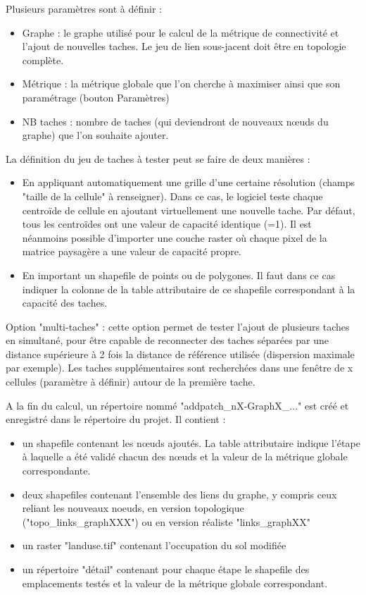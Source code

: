 \documentclass{article}
\begin{document}
Plusieurs paramètres sont à définir :
\begin{itemize}
	\item Graphe : le graphe utilisé pour le calcul de la métrique de connectivité et l’ajout de nouvelles taches. Le jeu de lien sous-jacent doit être en topologie complète.
	\item Métrique : la métrique globale que l’on cherche à maximiser ainsi que son paramétrage (bouton Paramètres)
	\item NB taches : nombre de taches (qui deviendront de nouveaux nœuds du graphe) que l’on souhaite ajouter.
\end{itemize}

La définition du jeu de taches à tester peut se faire de deux manières : 
\begin{itemize}
	\item En appliquant automatiquement une grille d’une certaine résolution (champs "taille de la cellule" à renseigner). Dans ce cas, le logiciel teste chaque centroïde de cellule en ajoutant virtuellement une nouvelle tache. Par défaut, tous les centroïdes ont une valeur de capacité identique (=1). Il est néanmoins possible d’importer une couche raster où chaque pixel de la matrice paysagère a une valeur de capacité propre.
	\item En important un shapefile de points ou de polygones. Il faut dans ce cas indiquer la colonne de la table attributaire de ce shapefile correspondant à la capacité des taches.
\end{itemize}

Option "multi-taches" : cette option permet de tester l’ajout de plusieurs taches en simultané, pour être capable de reconnecter des taches séparées par une distance supérieure à 2 fois la distance de référence utilisée (dispersion maximale par exemple). Les taches supplémentaires sont recherchées dans une fenêtre de x cellules (paramètre à définir) autour de la première tache. 

A la fin du calcul, un répertoire nommé "addpatch\_nX-GraphX\_..." est créé et enregistré dans le répertoire du projet. Il contient :
\begin{itemize}
	\item un shapefile contenant les nœuds ajoutés. La table attributaire indique l’étape à laquelle a été validé chacun des nœuds et la valeur de la métrique globale correspondante.
	\item deux shapefiles contenant l’ensemble des liens du graphe, y compris ceux reliant les nouveaux noeuds, en version topologique ("topo\_links\_graphXXX") ou en version réaliste "links\_graphXX"
	\item un raster "landuse.tif" contenant l'occupation du sol modifiée
	\item un répertoire "détail" contenant pour chaque étape le shapefile des emplacements testés et la valeur de la métrique globale correspondant.
\end{itemize}
\end{document}
